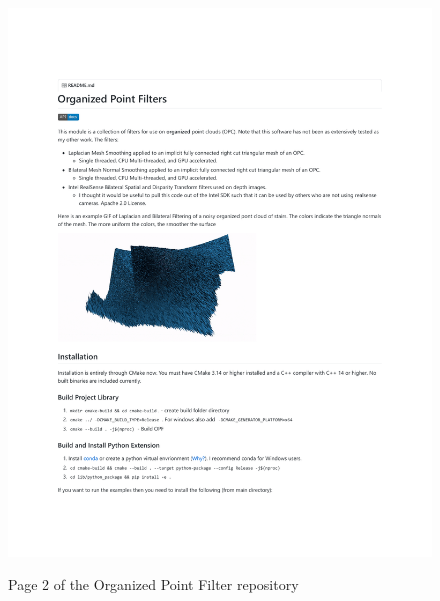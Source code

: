 \begin{figure}[h!]
    \centering\includegraphics[page=2, trim=1.0in 1.0in 1.0in 1.0in, width=.93\linewidth]{appendix_1/imgs/OPFReadme.pdf}
    \label{fig:apx1_opc2}
    \caption{Page 2 of the Organized Point Filter repository} 
\end{figure}



% 
% 


